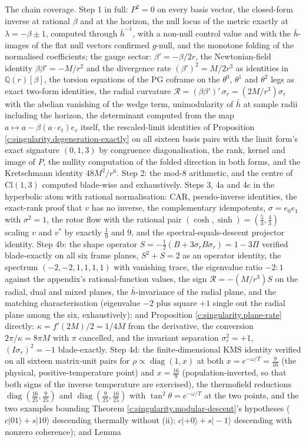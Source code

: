 \documentclass[11pt]{article}
\theoremstyle{definition}
\theoremstyle{plain}
\providecommand{\Cl}{}\renewcommand{\Cl}{\mathrm{Cl}}
\providecommand{\hb}{}\renewcommand{\hb}{\bar{h}}
\begin{document}
The chain coverage. Step 1 in full: $P^2 = 0$ on every basis vector, the closed-form inverse at rational $\beta$ and at the horizon, the null locus of the metric exactly at $\lambda = -\beta \pm 1$, computed through $\hb^{-1}$, with a non-null control value and with the $\hb$-images of the flat null vectors confirmed $g$-null, and the monotone folding of the normalised coefficients; the gauge sector: $\beta' = -\beta/2r$, the Newtonian-field identity $\beta\beta' = -M/r^2$ and the divergence rate $(\beta')^2 = M/2r^3$ as identities in $\mathbb{Q}(r)[\beta]$, the torsion equations of the PG coframe on the $\theta^0$, $\theta^1$ and $\theta^2$ legs as exact two-form identities, the radial curvature $\mathcal{R} = (\beta\beta')'\,\sigma_r = (2M/r^3)\sigma_r$ with the abelian vanishing of the wedge term, unimodularity of $\hb$ at sample radii including the horizon, the determinant computed from the map $a \mapsto a - \beta(a \cdot e_t)e_r$ itself, the rescaled-limit identities of Proposition \ref{c:singularity.degeneration-exactly} on all sixteen basis pairs with the limit form's exact signature $(0,1,3)$ by congruence diagonalisation, the rank, kernel and image of $P$, the nullity computation of the folded direction in both forms, and the Kretschmann identity $48M^2/r^6$. Step 2: the mod-8 arithmetic, and the centre of $\Cl(1,3)$ computed blade-wise and exhaustively. Steps 3, 4a and 4c in the hyperbolic atom with rational normalisation: CAR, pseudo-inverse identities, the exact-rank proof that $v$ has no inverse, the complementary idempotents, $\sigma = e_0 e_1$ with $\sigma^2 = 1$, the rotor flow with the rational pair $(\cosh, \sinh) = (\tfrac53, \tfrac43)$ scaling $v$ and $v^*$ by exactly $\tfrac19$ and $9$, and the spectral-equals-descent projector identity. Step 4b: the shape operator $S = -\tfrac12(B + 3\sigma_r B\sigma_r) = 1 - 3\Pi$ verified blade-exactly on all six frame planes, $S^2 + S = 2$ as an operator identity, the spectrum $(-2,-2,1,1,1,1)$ with vanishing trace, the eigenvalue ratio $-2 : 1$ against the appendix's rational-function values, the sign $\mathcal{R} = -(M/r^{3})S$ on the radial, dual and mixed planes, the $\hb$-invariance of the radial plane, and the matching characterisation (eigenvalue $-2$ plus square $+1$ single out the radial plane among the six, exhaustively); and Proposition \ref{c:singularity.plane-rate} directly: $\kappa = f'(2M)/2 = 1/4M$ from the derivative, the conversion $2\pi/\kappa = 8\pi M$ with $\pi$ cancelled, and the invariant separation $\sigma_r^{2} = +1$, $(I\sigma_r)^{2} = -1$ blade-exactly. Step 4d: the finite-dimensional KMS identity verified on all sixteen matrix-unit pairs for $\rho \propto \operatorname{diag}(1, x)$ at both $x = e^{-\omega/T} = \tfrac{9}{16}$ (the physical, positive-temperature point) and $x = \tfrac{16}{9}$ (population-inverted, so that both signs of the inverse temperature are exercised), the thermofield reductions $\operatorname{diag}(\tfrac{16}{25}, \tfrac{9}{25})$ and $\operatorname{diag}(\tfrac{9}{25}, \tfrac{16}{25})$ with $\tan^2\theta = e^{-\omega/T}$ at the two points, and the two examples bounding Theorem \ref{c:singularity.modular-descent}'s hypotheses ($c|01\rangle + s|10\rangle$ descending thermally without (ii); $c|{+}0\rangle + s|{-}1\rangle$ descending with nonzero coherence); and Lemma 
\end{document}

